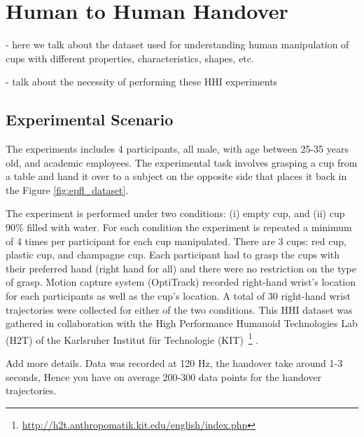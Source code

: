 \section{Human to Human Handover}

- here we talk about the dataset used for understanding human manipulation of cups with different properties, characteristics, shapes, etc.

- talk about the necessity of performing these HHI experiments 

\subsection{Experimental Scenario}

The experiments includes 4 participants, all male, with age between 25-35 years old, and academic employees. The experimental task involves grasping a cup from a table and hand it over to a subject on the opposite side that places it back in the Figure \ref{fig:epfl_dataset}.

The experiment is performed under two conditions: (i) empty cup, and (ii) cup 90\% filled with water. For each condition the experiment is repeated a minimum of 4 times per participant for each cup manipulated. There are 3 cups: red cup, plastic cup, and champagne cup. Each participant had to grasp the cups with their preferred hand (right hand for all) and there were no restriction on the type of grasp. Motion capture system (OptiTrack) recorded right-hand wrist's location for each participants as well as the cup's location. A total of 30 right-hand wrist trajectories were collected for either of the two conditions. This HHI dataset was gathered in collaboration with the High Performance Humanoid Technologies Lab (H2T) of the Karlsruher Institut für Technologie (KIT)~\footnote{\url{http://h2t.anthropomatik.kit.edu/english/index.php}} \cite{starke2019force}.

Add more details. Data was recorded at 120 Hz, the handover take around 1-3 seconds, Hence you have on average 200-300 data points for the handover trajectories.

